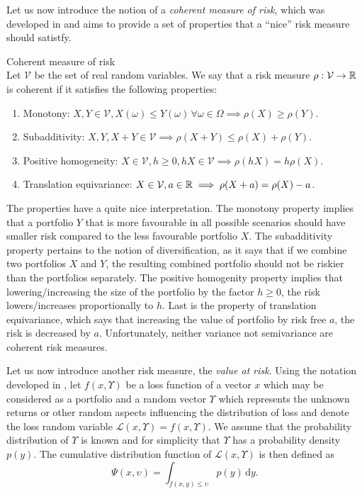 Let us now introduce the notion of a \textit{coherent measure of risk}, which was developed in \cite[Defintion 2.4.]{coherent_measures_of_risk} and aims to provide a set of properties that a “nice” risk measure should satistfy.
\newpage
\begin{defn}{\normalfont Coherent measure of risk} \\
Let $\mathcal{V}$ be the set of real random variables. We say that a risk measure $\rho: \mathcal{V} \rightarrow \mathbb{R}$ is coherent if it satisfies the following properties:
\begin{enumerate}
	\item Monotony: $X, Y \in \mathcal{V}, X(\omega) \leq Y(\omega) \, \forall \omega \in \Omega \implies \rho(X) \geq \rho(Y)$.
	\item Subadditivity: $X, Y, X+Y \in \mathcal{V} \implies \rho(X+	Y) \leq \rho(X) + \rho(Y)$.
	\item Positive homogeneity: $X \in \mathcal{V}, h \geq 0, hX \in \mathcal{V} \implies \rho(hX)=h\rho(X)$.
	\item Translation equivariance: $X \in \mathcal{V}, a \in \mathbb{R} \implies \rho(X+a)=\rho(X)-a$.
\end{enumerate}
\end{defn}
The properties have a quite nice interpretation. The monotony property implies that a portfolio $Y$ that is more favourable in all possible scenarios should have smaller risk compared to the less favourable portfolio $X$. The subadditivity property pertains to the notion of diversification, as it says that if we combine two portfolios $X$ and $Y$, the resulting combined portfolio should not be riskier than the portfolios separately. The positive homogenity property implies that lowering/increasing the size of the portfolio by the factor $h \geq 0$, the risk lowers/increases proportionally to $h$. Last is the property of translation equivariance, which says that increasing the value of portfolio by risk free $a$, the risk is decreased by $a$. Unfortunately, neither variance not semivariance are coherent risk measures.

Let us now introduce another risk measure, the \textit{value at risk}.
Using the notation developed in \cite{cornuejols_tutuncu_2006}, let $f(x,\Upsilon)$ be a loss function of a vector $x$ which may be considered as a portfolio and a random vector $\Upsilon$ which represents the unknown returns or other random aspects influencing the distribution of loss and denote the loss random variable $\mathcal{L}(x,\Upsilon)=f(x,\Upsilon)$. We assume that the probability distribution of $\Upsilon$ is known and for simplicity that $\Upsilon$ has a probability density $p(y)$. The cumulative distribution function of $\mathcal{L}(x,\Upsilon)$ is then defined as
\begin{equation*}
\Psi(x,\upsilon)=\int_{f(x,y) \leq \upsilon} p(y) \, \mathrm{d}y.
\end{equation*}

